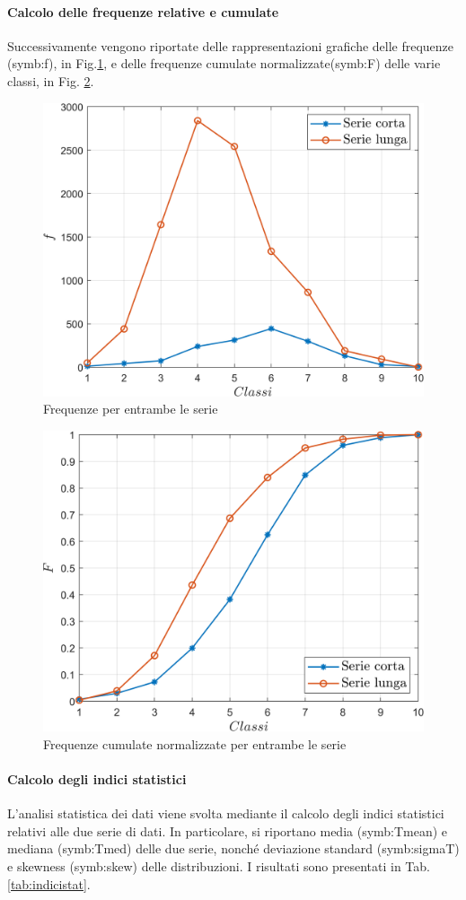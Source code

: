 \paragraph{Calcolo delle frequenze relative e cumulate}
Successivamente vengono riportate delle rappresentazioni grafiche 
delle frequenze (\gls{symb:f}), in Fig.\ref{fig:relboth}, e delle frequenze cumulate normalizzate(\gls{symb:F}) delle varie classi, in Fig. \ref{fig:cumboth}.


\begin{figure}[H]
	\centering
	\includegraphics[width=0.6\linewidth]{"../sperimentazione nei propulsori/relboth"}
	\caption{Frequenze per entrambe le serie}
	\label{fig:relboth}
\end{figure}


\begin{figure}[H]
	\centering
	\includegraphics[width=0.6\linewidth]{"../sperimentazione nei propulsori/cumboth"}
	\caption{Frequenze cumulate normalizzate per entrambe le serie}
	\label{fig:cumboth}
\end{figure}



\paragraph{Calcolo degli indici statistici}
L'analisi statistica dei dati viene svolta mediante il calcolo degli indici statistici relativi alle due serie di dati. In particolare, si riportano media (\gls{symb:Tmean}) e mediana (\gls{symb:Tmed}) delle due serie, nonché deviazione standard (\gls{symb:sigmaT}) e skewness (\gls{symb:skew}) delle distribuzioni. I risultati sono presentati in Tab.\ref{tab:indicistat}.

